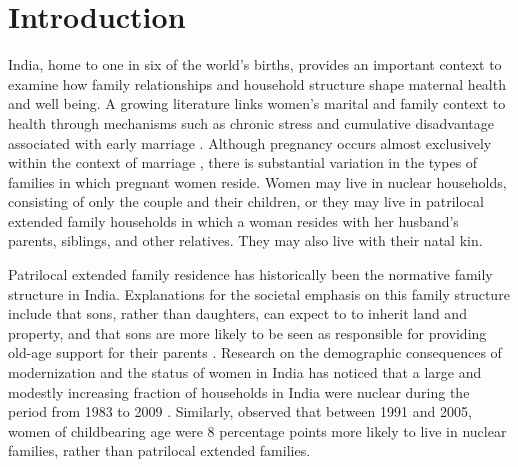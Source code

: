 \documentclass[12pt]{article}
\begin{document}
 
\vspace*{12pt}

\setlength{\parskip}{0ex}

\pagestyle{fancy}
\setcounter{footnote}{\autorzahl}
\newpage


\section*{Introduction}\label{sec:Introduction} %

India, home to one in six of the world’s births, provides an important context to examine how family relationships and household structure shape maternal health and well being. A growing literature links women's marital and family context to health through mechanisms such as chronic stress and cumulative disadvantage associated with early marriage \citep{vikram2021early}. Although pregnancy occurs almost exclusively within the context of marriage \citep{banerji2021does}, there is substantial variation in the types of families in which pregnant women reside. Women may live in nuclear households, consisting of only the couple and their children, or they may live in patrilocal extended family households in which a woman resides with her husband’s parents, siblings, and other relatives.  They may also live with their natal kin.

Patrilocal extended family residence has historically been the normative family structure in India.  Explanations for the societal emphasis on this family structure include that sons, rather than daughters, can expect to to inherit land and property, and that sons are more likely to be seen as responsible for providing old-age support for their parents \citep{dyson1983kinship, pande2007explaining, allendorf2020another, pandian2022rise}. Research on the demographic consequences of modernization and the status of women in India has noticed that a large and modestly increasing fraction of households in India were nuclear during the period from 1983 to 2009 \citep{breton2021modernisation}.  Similarly, \cite{allendorf2013going} observed that between 1991 and 2005, women of childbearing age were 8 percentage points more likely to live in nuclear families, rather than patrilocal extended families.
\end{document}
